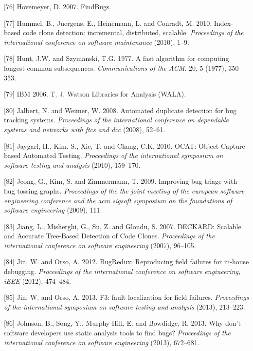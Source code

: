 \documentclass[12pt]{report}
\begin{document}
\hypertarget{ref-Hovemeyer2007}{}
{[}76{]} Hovemeyer, D. 2007. FindBugs.

\hypertarget{ref-Hummel2010}{}
{[}77{]} Hummel, B., Juergens, E., Heinemann, L. and Conradt, M. 2010.
Index-based code clone detection: incremental, distributed, scalable.
\emph{Proceedings of the international conference on software
maintenance} (2010), 1--9.

\hypertarget{ref-Hunt1977}{}
{[}78{]} Hunt, J.W. and Szymanski, T.G. 1977. A fast algorithm for
computing longest common subsequences. \emph{Communications of the ACM}.
20, 5 (1977), 350--353.

\hypertarget{ref-IBM2006}{}
{[}79{]} IBM 2006. T. J. Watson Libraries for Analysis (WALA).

\hypertarget{ref-Jalbert2008}{}
{[}80{]} Jalbert, N. and Weimer, W. 2008. Automated duplicate detection
for bug tracking systems. \emph{Proceedings of the international
conference on dependable systems and networks with ftcs and dcc} (2008),
52--61.

\hypertarget{ref-Jaygarl}{}
{[}81{]} Jaygarl, H., Kim, S., Xie, T. and Chang, C.K. 2010. OCAT:
Object Capture based Automated Testing. \emph{Proceedings of the
international symposium on software testing and analysis} (2010),
159--170.

\hypertarget{ref-Jeong2009}{}
{[}82{]} Jeong, G., Kim, S. and Zimmermann, T. 2009. Improving bug
triage with bug tossing graphs. \emph{Proceedings of the the joint
meeting of the european software engineering conference and the acm
sigsoft symposium on the foundations of software engineering} (2009),
111.

\hypertarget{ref-Jiang2007}{}
{[}83{]} Jiang, L., Misherghi, G., Su, Z. and Glondu, S. 2007. DECKARD:
Scalable and Accurate Tree-Based Detection of Code Clones.
\emph{Proceedings of the international conference on software
engineering} (2007), 96--105.

\hypertarget{ref-Jin2012}{}
{[}84{]} Jin, W. and Orso, A. 2012. BugRedux: Reproducing field failures
for in-house debugging. \emph{Proceedings of the international
conference on software engineering, iEEE} (2012), 474--484.

\hypertarget{ref-Jin2013}{}
{[}85{]} Jin, W. and Orso, A. 2013. F3: fault localization for field
failures. \emph{Proceedings of the international symposium on software
testing and analysis} (2013), 213--223.

\hypertarget{ref-Johnson2013}{}
{[}86{]} Johnson, B., Song, Y., Murphy-Hill, E. and Bowdidge, R. 2013.
Why don't software developers use static analysis tools to find bugs?
\emph{Proceedings of the international conference on software
engineering} (2013), 672--681.
\end{document}
